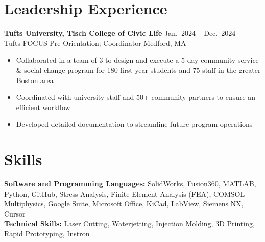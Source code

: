 \documentclass[a4paper, 10pt]{article}
\newcommand{\role}[1]{\textcolor{accent}{#1}}
\begin{document}
\section{Leadership Experience}

\textbf{Tufts University, Tisch College of Civic Life} \hfill Jan.\ 2024 -- Dec.\ 2024\\[1pt]
\role{Tufts FOCUS Pre-Orientation; Coordinator} \hfill \role{Medford, MA}
\begin{itemize}
  \item Collaborated in a team of 3 to design and execute a 5-day community service \& social change program for 180 first-year students and 75 staff in the greater Boston area
  \item Coordinated with university staff and 50+ community partners to ensure an efficient workflow
  \item Developed detailed documentation to streamline future program operations
\end{itemize}

\section{Skills}
\role{\textbf{Software and Programming Languages:}}
SolidWorks, Fusion360, MATLAB, Python, GitHub, Stress Analysis, Finite Element Analysis (FEA), COMSOL Multiphysics, Google Suite, Microsoft Office, KiCad, LabView, Siemens NX, Cursor\\[3pt]
\role{\textbf{Technical Skills:}}
Laser Cutting, Waterjetting, Injection Molding, 3D Printing, Rapid Prototyping, Instron
\end{document}
